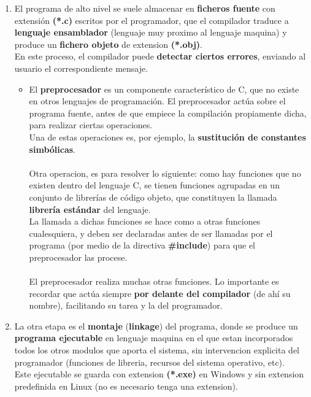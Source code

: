 \documentclass[letterpaper]{report}
\begin{document}
\begin{enumerate}
  \item El programa de alto nivel se suele almacenar en \textbf{ficheros fuente} con extensión \textbf{(*.c)} escritos por el programador, que el compilador traduce a \textbf{lenguaje ensamblador} (lenguaje muy proximo al lenguaje maquina) y produce un \textbf{fichero objeto} de extension \textbf{(*.obj)}.\\
  En este proceso, el compilador puede \textbf{detectar ciertos errores}, enviando al usuario el correspondiente mensaje.
  \begin{itemize}
    \item El \textbf{preprocesador} es un componente característico de C, que no existe en otros lenguajes de
programación. El preprocesador actúa sobre el programa fuente, antes de que empiece la compilación propiamente dicha, para realizar ciertas operaciones.\\ Una de estas operaciones es, por ejemplo, la \textbf{sustitución de constantes simbólicas}.\\\\
Otra operacion, es para resolver lo siguiente: como hay funciones que no existen dentro del lenguaje C, se tienen funciones agrupadas en un conjunto de librerías de código objeto, que constituyen la llamada \textbf{librería estándar} del lenguaje.\\ La llamada a dichas funciones se hace como a otras funciones cualesquiera, y deben ser declaradas antes de ser llamadas por el programa (por medio de la directiva \textbf{\#include}) para que el preprocesador las procese.\\\\
El preprocesador realiza muchas otras funciones. Lo importante es recordar que actúa siempre \textbf{por delante del compilador} (de ahí su nombre), facilitando su tarea y la del programador.
  
  \end{itemize}
  \item La otra etapa es el \textbf{montaje} (\textbf{linkage}) del programa, donde se produce un \textbf{programa ejecutable} en lenguaje maquina en el que estan incorporados todos los otros modulos que aporta el sistema, sin intervencion explicita del programador (funciones de libreria, recursos del sistema operativo, etc).\\
  Este ejecutable se guarda con extension \textbf{(*.exe)} en Windows y sin extension predefinida en Linux (no es necesario tenga una extension).
\end{enumerate}
\pagebreak
\end{document}
